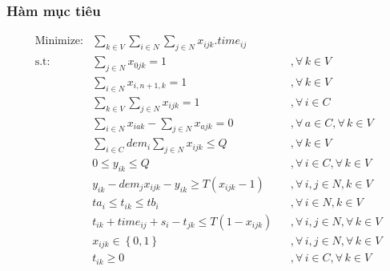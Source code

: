 \documentclass[12pt,a4paper]{article}\author{Nguyễn Nho Dũng}
\newcommand{\taphop}[1]{\left\{#1\right\}}
\newcommand{\ngoacto}[1]{\left(#1\right)}
\newcommand{\tong}[1]{\sum_{#1}}
\begin{document}
\subsubsection*{Hàm mục tiêu}
\begin{align}
	\text{Minimize:} & \tong{k\in V}\tong{i\in N}\tong{j\in N} x_{ijk}.time_{ij} && \label{obj_func}\\
	\text{s.t:} & \tong{j\in N} x_{0jk} = 1 &&,\forall\, k\in V\label{cons:1}\\
	& \tong{i\in N}x_{i,n+1,k} = 1 &&,\forall\, k \in V\label{cons:2}\\
	& \tong{k\in V}\tong{j\in N} x_{ijk} = 1 &&,\forall\, i\in C\label{cons:3}\\
	& \tong{i\in N} x_{iak} - \tong{j\in N} x_{ajk} = 0 &&,\forall\, a\in C, \forall\, k\in V\label{cons:4}\\
	& \tong{i\in C} dem_i \tong{j\in N} x_{ijk} \le Q &&,\forall\, k\in V\label{cons:5}\\
	& 0 \le y_{ik} \le Q &&,\forall\, i\in C, \forall\, k \in V\label{cons:6}\\
	& y_{ik} - dem_jx_{ijk} - y_{ik} \ge T\ngoacto{x_{ijk} - 1} &&,\forall\, i, j \in N, k\in V\label{cons:7}\\
	& ta_i \le t_{ik} \le tb_i &&,\forall\, i \in N, k \in V\label{cons:8}\\
	& t_{ik} + time_{ij} + s_i - t_{jk} \le T\ngoacto{1-x_{ijk}} &&,\forall\, i, j \in N, \forall\, k \in V\label{cons:9}\\
	& x_{ijk} \in \taphop{0, 1} &&,\forall\, i, j\in N, \forall\, k\in V\label{cons:10}\\
	& t_{ik} \ge 0 &&,\forall\, i\in C, \forall\, k\in V\label{cons:11}
\end{align}
\end{document}

